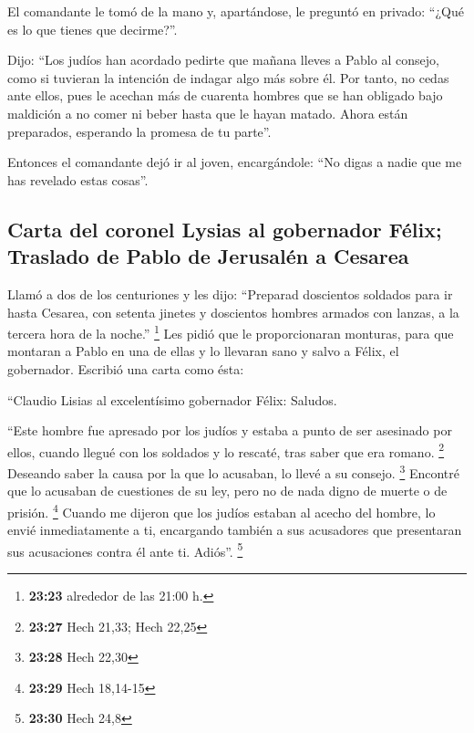  El comandante le tomó de la mano y, apartándose, le
preguntó en privado: ``¿Qué es lo que tienes que decirme?''.

 Dijo: ``Los judíos han acordado pedirte que mañana
lleves a Pablo al consejo, como si tuvieran la intención de indagar algo
más sobre él.  Por tanto, no cedas ante ellos, pues le
acechan más de cuarenta hombres que se han obligado bajo maldición a no
comer ni beber hasta que le hayan matado. Ahora están preparados,
esperando la promesa de tu parte''.

 Entonces el comandante dejó ir al joven, encargándole:
``No digas a nadie que me has revelado estas cosas''.

\hypertarget{carta-del-coronel-lysias-al-gobernador-fuxe9lix-traslado-de-pablo-de-jerusaluxe9n-a-cesarea}{%
\subsection{Carta del coronel Lysias al gobernador Félix; Traslado de
Pablo de Jerusalén a
Cesarea}\label{carta-del-coronel-lysias-al-gobernador-fuxe9lix-traslado-de-pablo-de-jerusaluxe9n-a-cesarea}}

 Llamó a dos de los centuriones y les dijo: ``Preparad
doscientos soldados para ir hasta Cesarea, con setenta jinetes y
doscientos hombres armados con lanzas, a la tercera hora de la noche.''
\footnote{\textbf{23:23} alrededor de las 21:00 h.}  Les
pidió que le proporcionaran monturas, para que montaran a Pablo en una
de ellas y lo llevaran sano y salvo a Félix, el gobernador.
 Escribió una carta como ésta:

 ``Claudio Lisias al excelentísimo gobernador Félix:
Saludos.

 ``Este hombre fue apresado por los judíos y estaba a
punto de ser asesinado por ellos, cuando llegué con los soldados y lo
rescaté, tras saber que era romano. \footnote{\textbf{23:27} Hech 21,33;
  Hech 22,25}  Deseando saber la causa por la que lo
acusaban, lo llevé a su consejo. \footnote{\textbf{23:28} Hech 22,30}
 Encontré que lo acusaban de cuestiones de su ley, pero
no de nada digno de muerte o de prisión. \footnote{\textbf{23:29} Hech
  18,14-15}  Cuando me dijeron que los judíos estaban al
acecho del hombre, lo envié inmediatamente a ti, encargando también a
sus acusadores que presentaran sus acusaciones contra él ante ti.
Adiós''. \footnote{\textbf{23:30} Hech 24,8}

